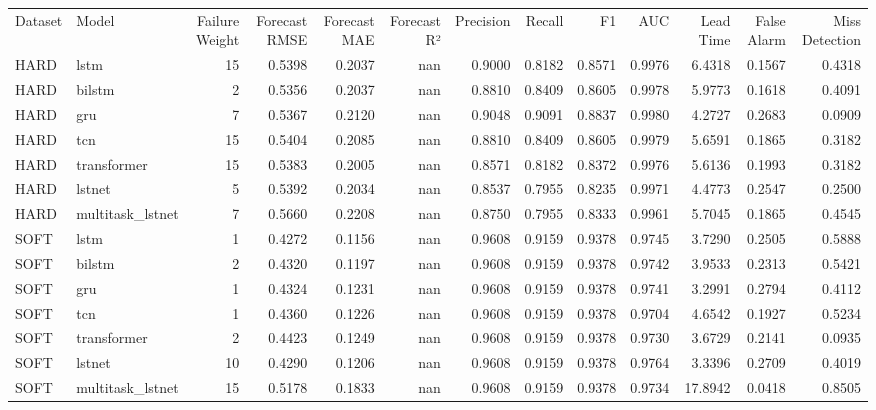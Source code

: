 \begin{tabular}{llrrrrrrrrrrr}
Dataset & Model & Failure Weight & Forecast RMSE & Forecast MAE & Forecast R² & Precision & Recall & F1 & AUC & Lead Time & False Alarm & Miss Detection \\
HARD & lstm & 15 & 0.5398 & 0.2037 & nan & 0.9000 & 0.8182 & 0.8571 & 0.9976 & 6.4318 & 0.1567 & 0.4318 \\
HARD & bilstm & 2 & 0.5356 & 0.2037 & nan & 0.8810 & 0.8409 & 0.8605 & 0.9978 & 5.9773 & 0.1618 & 0.4091 \\
HARD & gru & 7 & 0.5367 & 0.2120 & nan & 0.9048 & 0.9091 & 0.8837 & 0.9980 & 4.2727 & 0.2683 & 0.0909 \\
HARD & tcn & 15 & 0.5404 & 0.2085 & nan & 0.8810 & 0.8409 & 0.8605 & 0.9979 & 5.6591 & 0.1865 & 0.3182 \\
HARD & transformer & 15 & 0.5383 & 0.2005 & nan & 0.8571 & 0.8182 & 0.8372 & 0.9976 & 5.6136 & 0.1993 & 0.3182 \\
HARD & lstnet & 5 & 0.5392 & 0.2034 & nan & 0.8537 & 0.7955 & 0.8235 & 0.9971 & 4.4773 & 0.2547 & 0.2500 \\
HARD & multitask_lstnet & 7 & 0.5660 & 0.2208 & nan & 0.8750 & 0.7955 & 0.8333 & 0.9961 & 5.7045 & 0.1865 & 0.4545 \\
SOFT & lstm & 1 & 0.4272 & 0.1156 & nan & 0.9608 & 0.9159 & 0.9378 & 0.9745 & 3.7290 & 0.2505 & 0.5888 \\
SOFT & bilstm & 2 & 0.4320 & 0.1197 & nan & 0.9608 & 0.9159 & 0.9378 & 0.9742 & 3.9533 & 0.2313 & 0.5421 \\
SOFT & gru & 1 & 0.4324 & 0.1231 & nan & 0.9608 & 0.9159 & 0.9378 & 0.9741 & 3.2991 & 0.2794 & 0.4112 \\
SOFT & tcn & 1 & 0.4360 & 0.1226 & nan & 0.9608 & 0.9159 & 0.9378 & 0.9704 & 4.6542 & 0.1927 & 0.5234 \\
SOFT & transformer & 2 & 0.4423 & 0.1249 & nan & 0.9608 & 0.9159 & 0.9378 & 0.9730 & 3.6729 & 0.2141 & 0.0935 \\
SOFT & lstnet & 10 & 0.4290 & 0.1206 & nan & 0.9608 & 0.9159 & 0.9378 & 0.9764 & 3.3396 & 0.2709 & 0.4019 \\
SOFT & multitask_lstnet & 15 & 0.5178 & 0.1833 & nan & 0.9608 & 0.9159 & 0.9378 & 0.9734 & 17.8942 & 0.0418 & 0.8505 \\
\end{tabular}
